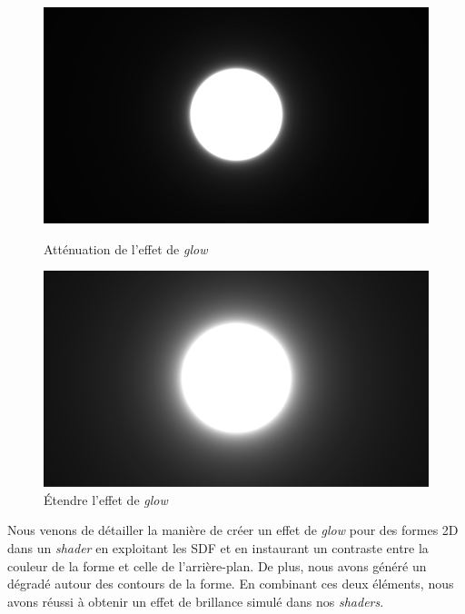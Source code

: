 \begin{figure}[h]
  \begin{minipage}[b]{0.45\linewidth}
    \centering
    \includegraphics[width=\linewidth]{images/shaders/glow3.png}
    \caption{Atténuation de l'effet de \textit{glow}}
    \label{glow3}
  \end{minipage}
  \hspace{0.1\linewidth} %
  \begin{minipage}[b]{0.45\linewidth}
    \centering
    \includegraphics[width=\linewidth]{images/shaders/glow4.png}
    \caption{Étendre l'effet de \textit{glow}}
    \label{glow4}
  \end{minipage}
\end{figure}

Nous venons de détailler la manière de créer un effet de \textit{glow} pour des formes 2D dans un \textit{shader} en exploitant les SDF et en instaurant un contraste entre la couleur de la forme et celle de l'arrière-plan. De plus, nous avons généré un dégradé autour des contours de la forme. En combinant ces deux éléments, nous avons réussi à obtenir un effet de brillance simulé dans nos \textit{shaders}.

